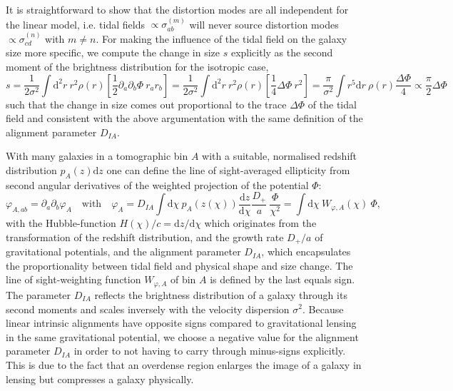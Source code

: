 \documentclass[a4paper,fleqn,usenatbib]{mnras}
\newcommand{\dd}{\mathrm{d}}
\begin{document}
It is straightforward to show that the distortion modes are all independent for the linear model, i.e. tidal fields $\propto\sigma^{(m)}_{ab}$ will never source distortion modes $\propto\sigma^{(n)}_{cd}$ with $m\neq n$. For making the influence of the tidal field on the galaxy size more specific, we compute the change in size $s$ explicitly as the second moment of the brightness distribution for the isotropic case,
\begin{equation}
s = 
\frac{1}{2\sigma^2}\int\dd^2r\:r^2\rho(r)\left[\frac{1}{2}\partial_a\partial_b\Phi\: r_ar_b\right] =
\frac{1}{2\sigma^2}\int\dd^2r\:r^2\rho(r)\left[\frac{1}{4}\Delta\Phi\:r^2\right] = 
\frac{\pi}{\sigma^2}\int r^5\dd r\:\rho(r)\frac{\Delta\Phi}{4} \propto \frac{\pi}{2}\Delta\Phi
\end{equation}
such that the change in size comes out proportional to the trace $\Delta\Phi$ of the tidal field and consistent with the above argumentation with the same definition of the alignment parameter $D_{IA}$. 

With many galaxies in a tomographic bin $A$ with a suitable, normalised redshift distribution $p_A(z)\dd z$ one can define the line of sight-averaged ellipticity from second angular derivatives of the weighted projection of the potential $\Phi$:
\begin{equation}
\varphi_{A,ab} = \partial_a\partial_b\varphi_A
\quad\mathrm{with}\quad
\varphi_A = D_{IA}\int\dd\chi\:p_A(z(\chi))\frac{\dd z}{\dd\chi}\frac{D_+}{a}\:\frac{\Phi}{\chi^2} = \int\dd\chi\:W_{\varphi,A}(\chi)\:\Phi,
\label{eqn_ia_los}
\end{equation}
with the Hubble-function $H(\chi)/c = \dd z/\dd\chi$ which originates from the transformation of the redshift distribution, and the growth rate $D_+/a$ of gravitational potentials, and the alignment parameter $D_{IA}$, which encapsulates the proportionality between tidal field and physical shape and size change. The line of sight-weighting function $W_{\varphi,A}$ of bin $A$ is defined by the last equals sign. The parameter $D_{IA}$ reflects the brightness distribution of a galaxy through its second moments and scales inversely with the velocity dispersion $\sigma^2$. Because linear intrinsic alignments have opposite signs compared to gravitational lensing in the same gravitational potential, we choose a negative value for the alignment parameter $D_{IA}$ in order to not having to carry through minus-signs explicitly. This is due to the fact that an overdense region enlarges the image of a galaxy in lensing but compresses a galaxy physically.
\end{document}
